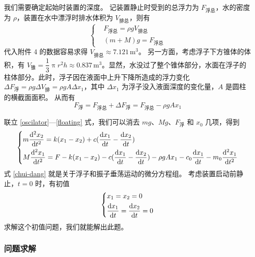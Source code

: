 我们需要确定起始时装置的深度。
记装置静止时受到的总浮力为 $F_\text{浮总}$，水的密度为 $\rho$，装置在水中漂浮时排水体积为 $V_\text{排总}$，则有
\begin{equation}
    \left\{
    \begin{aligned}
        & F_\text{浮总}=\rho gV_\text{排总} \\
        & (m+M)g=F_\text{浮总}
    \end{aligned}
    \right.
    \label{floating-relationship}
\end{equation}
代入附件 4 的数据容易求得 $V_\text{排总}\approx7.121\,\mathrm{m}^3$。
另一方面，考虑浮子下方锥体的体积，有 $V_\text{锥}=\dfrac{1}3\uppi r^2h\approx0.837\,\mathrm{m}^3$。显然，水没过了整个锥体部分，水面在浮子的柱体部分。此时，浮子因在液面中上升下降所造成的浮力变化 $\Delta F_\text{浮}=\rho g\Delta V_{排}=\rho gA\Delta x_1$，其中 $\Delta x_1$ 为浮子没入液面深度的变化量，$A$ 是圆柱的横截面面积。
从而有
\begin{equation}
    F_\text{浮}=F_\text{浮总}+\Delta F_\text{浮}=F_\text{浮总}-\rho gAx_1
    \label{floating}
\end{equation}

联立 \eqref{oscilator}—\eqref{floating} 式，我们可以消去 $mg$、$Mg$、$F_\text{浮}$ 和 $x_0$ 几项，得到
\begin{equation}
    \left\{
    \begin{aligned}
        &  m\dfrac{\dif^2x_2}{\dif t^2}=k(x_1-x_2)+c(\dfrac{\dif{x_1}}{\dif{t}}-\dfrac{\dif{x_2}}{\dif{t}}) \\
        &  M\dfrac{\dif^2x_1}{\dif t^2}=F-k(x_1-x_2)-c(\dfrac{\dif{x_1}}{\dif{t}}-\dfrac{\dif{x_2}}{\dif{t}})-\rho gAx_1-c_0\dfrac{\dif{x_1}}{\dif{t}}-m_0\dfrac{\dif^2 x_1}{\dif t^2}
    \end{aligned}
    \right.
    \label{chui-dang}
\end{equation}
式 \eqref{chui-dang} 就是关于浮子和振子垂荡运动的微分方程组。
考虑装置启动前静止，$t=0$ 时，有初值
\begin{equation}
    \left\{
    \begin{aligned}
        & x_1=x_2=0 \\
        & \dfrac{\mathop{}\!\mathrm{d} x_1}{\mathop{}\!\mathrm{d} t}=\dfrac{\mathop{}\!\mathrm{d} x_2}{\mathop{}\!\mathrm{d} t}=0
    \end{aligned}
    \right.
\end{equation}
求解这个初值问题，我们就能解出此题。

\subsubsection{问题求解}

